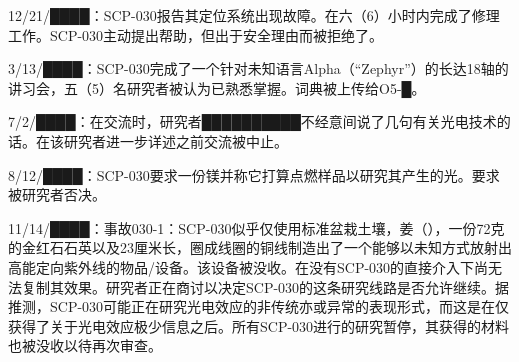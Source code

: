 12\slash 21\slash ████：SCP-030报告其定位系统出现故障。在六（6）小时内完成了修理工作。SCP-030主动提出帮助，但出于安全理由而被拒绝了。

3\slash 13\slash ████：SCP-030完成了一个针对未知语言Alpha（“Zephyr”）的长达18轴的讲习会，五（5）名研究者被认为已熟悉掌握。词典被上传给O5-█。

7\slash 2\slash ████：在交流时，研究者██████████不经意间说了几句有关光电技术的话。在该研究者进一步详述之前交流被中止。

8\slash 12\slash ████：SCP-030要求一份镁并称它打算点燃样品以研究其产生的光。要求被研究者否决。

11\slash 14\slash ████：事故030-1：SCP-030似乎仅使用标准盆栽土壤，姜（），一份72克的金红石石英以及23厘米长，圈成线圈的铜线制造出了一个能够以未知方式放射出高能定向紫外线的物品\slash 设备。该设备被没收。在没有SCP-030的直接介入下尚无法复制其效果。研究者正在商讨以决定SCP-030的这条研究线路是否允许继续。据推测，SCP-030可能正在研究光电效应的非传统亦或异常的表现形式，而这是在仅获得了关于光电效应极少信息之后。所有SCP-030进行的研究暂停，其获得的材料也被没收以待再次审查。
